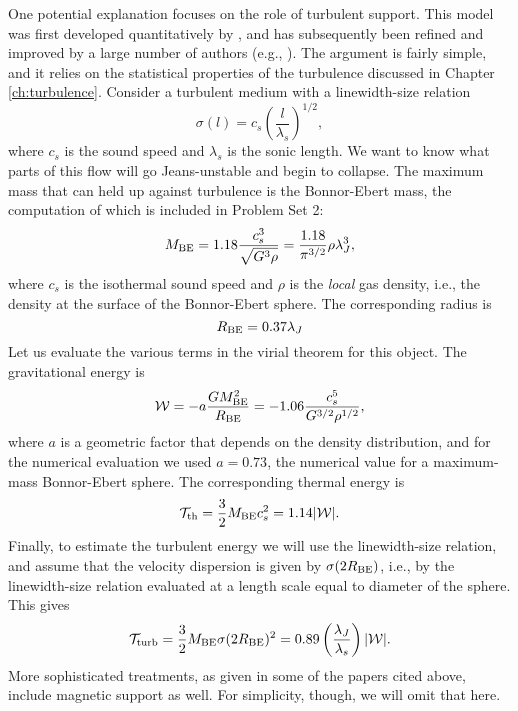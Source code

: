 One potential explanation focuses on the role of turbulent support. This model was first developed quantitatively by \citet{krumholz05c}, and has subsequently been refined and improved by a large number of authors (e.g., \citealt{hennebelle11b, padoan11a, padoan14a, federrath12a}). The argument is fairly simple, and it relies on the statistical properties of the turbulence discussed in Chapter \ref{ch:turbulence}. Consider a turbulent medium with a linewidth-size relation
\begin{equation}
\sigma(l)=c_s\left(\frac{l}{\lambda_s}\right)^{1/2},
\end{equation}
where $c_s$ is the sound speed and $\lambda_s$ is the sonic length. We want to know what parts of this flow will go Jeans-unstable and begin to collapse. The maximum mass that can held up against turbulence is the Bonnor-Ebert mass, the computation of which is included in Problem Set 2:
\begin{equation}
M_{\rm BE} = 1.18 \frac{c_s^3}{\sqrt{G^3\rho}} = \frac{1.18}{\pi^{3/2}}\rho \lambda_J^3,
\end{equation}
where $c_s$ is the isothermal sound speed and $\rho$ is the {\it local} gas density, i.e., the density at the surface of the Bonnor-Ebert sphere. The corresponding radius is
\begin{equation}
R_{\rm BE} = 0.37\lambda_J
\end{equation}
Let us evaluate the various terms in the virial theorem for this object. The gravitational energy is
\begin{equation}
\mathcal{W} = -a \frac{G M_{\rm BE}^2}{R_{\rm BE}} = -1.06 \frac{c_s^5}{G^{3/2} \rho^{1/2}},
\end{equation}
where $a$ is a geometric factor that depends on the density distribution, and for the numerical evaluation we used $a=0.73$, the numerical value for a maximum-mass Bonnor-Ebert sphere. The corresponding thermal energy is
\begin{equation}
\mathcal{T}_{\rm th} = \frac{3}{2}M_{\rm BE} c_s^2 = 1.14 |\mathcal{W}|.
\end{equation}
Finally, to estimate the turbulent energy we will use the linewidth-size relation, and assume that the velocity dispersion is given by $\sigma(2 R_{\rm BE})$, i.e., by the linewidth-size relation evaluated at a length scale equal to diameter of the sphere. This gives
\begin{equation}
\mathcal{T}_{\rm turb} = \frac{3}{2} M_{\rm BE} \sigma(2R_{\rm BE})^2 = 0.89 \left(\frac{\lambda_J}{\lambda_s}\right) |\mathcal{W}|.
\end{equation}
More sophisticated treatments, as given in some of the papers cited above, include magnetic support as well. For simplicity, though, we will omit that here.

